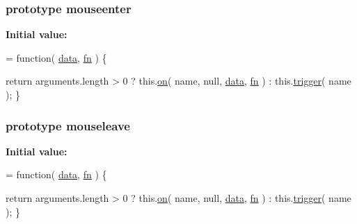 \hypertarget{jquery-1_810_82-vsdoc_8js_a762f67ea0a9dd89f27dbe2b23d9f91b9}{
\subsubsection[{mouseenter}]{ {\bf prototype} mouseenter}}\label{jquery-1_810_82-vsdoc_8js_a762f67ea0a9dd89f27dbe2b23d9f91b9}
{\bfseries Initial value\-:}
\begin{DoxyCode}
= \textcolor{keyword}{function}( \hyperlink{jquery-1_810_82-vsdoc_8js_a609407b3456fdc3c5671a9fc4a226ff7}{data}, \hyperlink{jquery-1_810_82-vsdoc_8js_acef6bdaf6b9b20fdcca1ea86f0902c3b}{fn} ) \{


        \textcolor{keywordflow}{return} arguments.length > 0 ?
            this.\hyperlink{jquery-1_810_82-vsdoc_8js_ae453b412b883f60220d73468ef6c6dbc}{on}( name, null, \hyperlink{jquery-1_810_82-vsdoc_8js_a609407b3456fdc3c5671a9fc4a226ff7}{data}, \hyperlink{jquery-1_810_82-vsdoc_8js_acef6bdaf6b9b20fdcca1ea86f0902c3b}{fn} ) :
            this.\hyperlink{jquery-1_810_82-vsdoc_8js_a2388c4114d5e3e4eab020f973641519c}{trigger}( name );
    \}
\end{DoxyCode}
\hypertarget{jquery-1_810_82-vsdoc_8js_a97f1b922fe119361e2016713603fbbab}{
\subsubsection[{mouseleave}]{ {\bf prototype} mouseleave}}\label{jquery-1_810_82-vsdoc_8js_a97f1b922fe119361e2016713603fbbab}
{\bfseries Initial value\-:}
\begin{DoxyCode}
= \textcolor{keyword}{function}( \hyperlink{jquery-1_810_82-vsdoc_8js_a609407b3456fdc3c5671a9fc4a226ff7}{data}, \hyperlink{jquery-1_810_82-vsdoc_8js_acef6bdaf6b9b20fdcca1ea86f0902c3b}{fn} ) \{


        \textcolor{keywordflow}{return} arguments.length > 0 ?
            this.\hyperlink{jquery-1_810_82-vsdoc_8js_ae453b412b883f60220d73468ef6c6dbc}{on}( name, null, \hyperlink{jquery-1_810_82-vsdoc_8js_a609407b3456fdc3c5671a9fc4a226ff7}{data}, \hyperlink{jquery-1_810_82-vsdoc_8js_acef6bdaf6b9b20fdcca1ea86f0902c3b}{fn} ) :
            this.\hyperlink{jquery-1_810_82-vsdoc_8js_a2388c4114d5e3e4eab020f973641519c}{trigger}( name );
    \}
\end{DoxyCode}
